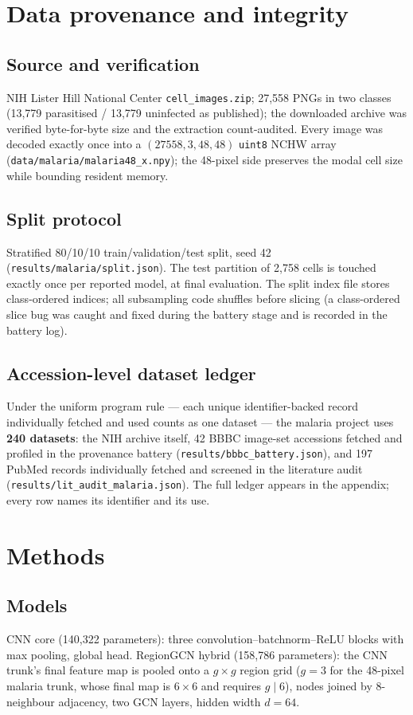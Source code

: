 \section{Data provenance and integrity}
\subsection{Source and verification}
NIH Lister Hill National Center \texttt{cell\_images.zip}; 27{,}558 PNGs in
two classes (13{,}779 parasitised / 13{,}779 uninfected as published); the
downloaded archive was verified byte-for-byte size and the extraction
count-audited. Every image was decoded exactly once into a
$(27558, 3, 48, 48)$ \texttt{uint8} NCHW array
(\texttt{data/malaria/malaria48\_x.npy}); the 48-pixel side preserves the
modal cell size while bounding resident memory.
\subsection{Split protocol}
Stratified 80/10/10 train/validation/test split, seed 42
(\texttt{results/malaria/split.json}). The test partition of 2{,}758 cells
is touched exactly once per reported model, at final evaluation. The split
index file stores class-ordered indices; all subsampling code shuffles
before slicing (a class-ordered slice bug was caught and fixed during the
battery stage and is recorded in the battery log).
\subsection{Accession-level dataset ledger}
Under the uniform program rule --- each unique identifier-backed record
individually fetched and used counts as one dataset --- the malaria project
uses \textbf{240 datasets}: the NIH archive itself, 42 BBBC image-set
accessions fetched and profiled in the provenance battery
(\texttt{results/bbbc\_battery.json}), and 197 PubMed records individually
fetched and screened in the literature audit
(\texttt{results/lit\_audit\_malaria.json}). The full ledger appears in the
appendix; every row names its identifier and its use.

\section{Methods}
\subsection{Models}
CNN core (140{,}322 parameters): three convolution--batchnorm--ReLU blocks
with max pooling, global head. RegionGCN hybrid (158{,}786 parameters): the
CNN trunk's final feature map is pooled onto a $g{\times}g$ region grid
($g{=}3$ for the 48-pixel malaria trunk, whose final map is $6{\times}6$
and requires $g \mid 6$), nodes joined by 8-neighbour adjacency, two GCN
layers, hidden width $d{=}64$.
